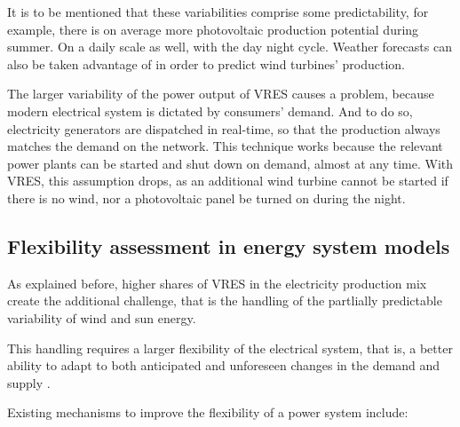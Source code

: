 It is to be mentioned that these variabilities comprise some predictability, for example, there is on average more photovoltaic production potential during summer. On a daily scale as well, with the day night cycle. Weather forecasts can also be taken advantage of in order to predict wind turbines' production.

The larger variability of the power output of VRES causes a problem, because modern electrical system is dictated by consumers' demand. And to do so, electricity generators are dispatched in real-time, so that the production always matches the demand on the network. This technique works because the relevant power plants can be started and shut down on demand, almost at any time. With VRES, this assumption drops, as an additional wind turbine cannot be started if there is no wind, nor a photovoltaic panel be turned on during the night.

\subsection{Flexibility assessment in energy system models}

As explained before, higher shares of VRES in the electricity production mix create the additional challenge, that is the handling of the partlially predictable variability of wind and sun energy. 

This handling requires a larger flexibility of the electrical system, that is, a better ability to adapt to both anticipated and unforeseen changes in the demand and supply \cite{irena}.

Existing mechanisms to improve the flexibility of a power system include:

